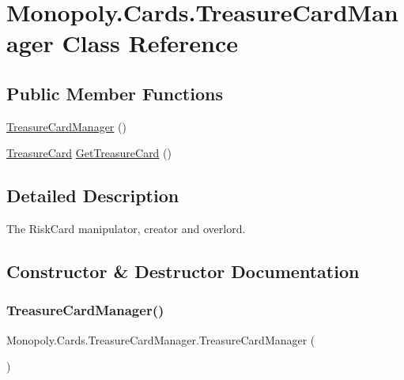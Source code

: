 \hypertarget{class_monopoly_1_1_cards_1_1_treasure_card_manager}{}\section{Monopoly.\+Cards.\+Treasure\+Card\+Manager Class Reference}
\label{class_monopoly_1_1_cards_1_1_treasure_card_manager}
\subsection*{Public Member Functions}
\begin{DoxyCompactItemize}
\item 
\mbox{\hyperlink{class_monopoly_1_1_cards_1_1_treasure_card_manager_af707d0e5f4879d53761879d6e96ff27b}{Treasure\+Card\+Manager}} ()
\item 
\mbox{\hyperlink{class_monopoly_1_1_main_1_1_treasure_card}{Treasure\+Card}} \mbox{\hyperlink{class_monopoly_1_1_cards_1_1_treasure_card_manager_abe8f64e3c6dd8bfe1708de51d2e8c83e}{Get\+Treasure\+Card}} ()
\end{DoxyCompactItemize}


\subsection{Detailed Description}
The Risk\+Card manipulator, creator and overlord. 

\subsection{Constructor \& Destructor Documentation}
\mbox{\label{class_monopoly_1_1_cards_1_1_treasure_card_manager_af707d0e5f4879d53761879d6e96ff27b}} 
\subsubsection{\texorpdfstring{Treasure\+Card\+Manager()}{TreasureCardManager()}}
{\footnotesize\ttfamily Monopoly.\+Cards.\+Treasure\+Card\+Manager.\+Treasure\+Card\+Manager (\begin{DoxyParamCaption}{ }\end{DoxyParamCaption})\hspace{0.3cm}{\ttfamily [inline]}}


